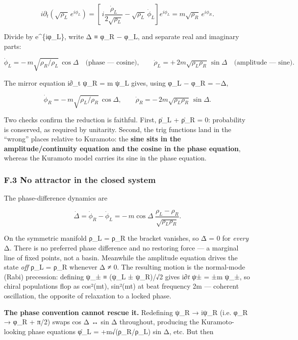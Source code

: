 \documentclass[
]{article}
\begin{document}
\[i\partial_t\!\left(\sqrt{\rho_L}\,e^{i\phi_L}\right) = \left[\,i\frac{\dot\rho_L}{2\sqrt{\rho_L}} - \sqrt{\rho_L}\,\dot\phi_L\right]e^{i\phi_L} = m\sqrt{\rho_R}\,e^{i\phi_R}.\]

Divide by e\^{}\{iφ\_L\}, write Δ ≡ φ\_R − φ\_L, and separate real and
imaginary parts:

\[\dot\phi_L = -\,m\sqrt{\rho_R/\rho_L}\,\cos\Delta \quad\text{(phase — cosine)}, \qquad \dot\rho_L = +\,2m\sqrt{\rho_L\rho_R}\,\sin\Delta \quad\text{(amplitude — sine)}.\]

The mirror equation i∂\_t ψ\_R = m ψ\_L gives, using φ\_L − φ\_R = −Δ,

\[\dot\phi_R = -\,m\sqrt{\rho_L/\rho_R}\,\cos\Delta, \qquad \dot\rho_R = -\,2m\sqrt{\rho_L\rho_R}\,\sin\Delta .\]

Two checks confirm the reduction is faithful. First, ρ̇\_L + ρ̇\_R = 0:
probability is conserved, as required by unitarity. Second, the trig
functions land in the ``wrong'' places relative to Kuramoto: the
\textbf{sine sits in the amplitude/continuity equation and the cosine in
the phase equation}, whereas the Kuramoto model carries its sine in the
phase equation.

\subsubsection{F.3 No attractor in the closed
system}\label{f.3-no-attractor-in-the-closed-system}

The phase-difference dynamics are

\[\dot\Delta = \dot\phi_R - \dot\phi_L = -\,m\cos\Delta\;\frac{\rho_L - \rho_R}{\sqrt{\rho_L\rho_R}}.\]

On the symmetric manifold ρ\_L = ρ\_R the bracket vanishes, so Δ̇ = 0 for
\emph{every} Δ. There is no preferred phase difference and no restoring
force --- a marginal line of fixed points, not a basin. Meanwhile the
amplitude equation drives the state \emph{off} ρ\_L = ρ\_R whenever Δ ≠
0. The resulting motion is the normal-mode (Rabi) precession: defining
ψ\_± ≡ (ψ\_L ± ψ\_R)/√2 gives i∂\emph{t ψ}± = ±m ψ\_±, so chiral
populations flop as cos²(mt), sin²(mt) at beat frequency 2m --- coherent
oscillation, the opposite of relaxation to a locked phase.

\textbf{The phase convention cannot rescue it.} Redefining ψ\_R → iψ\_R
(i.e. φ\_R → φ\_R + π/2) swaps cos Δ ↔ sin Δ throughout, producing the
Kuramoto-looking phase equations φ̇\_L = +m√(ρ\_R/ρ\_L) sin Δ, etc. But
then
\end{document}
